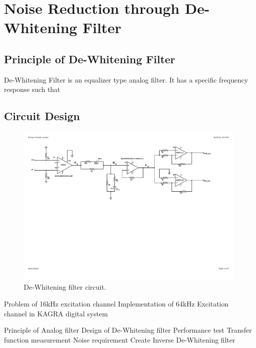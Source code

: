 

\chapter{Noise Reduction through De-Whitening Filter}

\section{Principle of De-Whitening Filter}
De-Whitening Filter is an equalizer type analog filter. It has a specific frequency response such that 


\section{Circuit Design}

\begin{figure}
\includegraphics[width=1\textwidth]{figure/DEWcircuit.pdf}
\caption{De-Whitening filter circuit. }\label{fig:dewcircuit}
\end{figure}


Problem of 16kHz excitation channel 
Implementation of 64kHz Excitation channel in KAGRA digital system

Principle of Analog filter
Design of De-Whitening filter
Performance test
Transfer function measurement 
Noise requirement
Create Inverse De-Whitening filter




